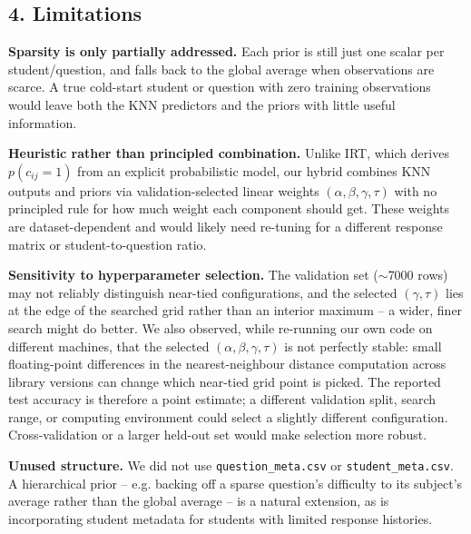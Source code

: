 \documentclass[11pt, letterpaper]{article}
\begin{document}
\subsection*{4. Limitations}

\textbf{Sparsity is only partially addressed.} Each prior is still just one scalar per student/question, and falls back to the global average when observations are scarce. A true cold-start student or question with zero training observations would leave both the KNN predictors and the priors with little useful information.

\textbf{Heuristic rather than principled combination.} Unlike IRT, which derives $p(c_{ij}=1)$ from an explicit probabilistic model, our hybrid combines KNN outputs and priors via validation-selected linear weights $(\alpha,\beta,\gamma,\tau)$ with no principled rule for how much weight each component should get. These weights are dataset-dependent and would likely need re-tuning for a different response matrix or student-to-question ratio.

\textbf{Sensitivity to hyperparameter selection.} The validation set ($\sim$7000 rows) may not reliably distinguish near-tied configurations, and the selected $(\gamma,\tau)$ lies at the edge of the searched grid rather than an interior maximum -- a wider, finer search might do better. We also observed, while re-running our own code on different machines, that the selected $(\alpha,\beta,\gamma,\tau)$ is not perfectly stable: small floating-point differences in the nearest-neighbour distance computation across library versions can change which near-tied grid point is picked. The reported test accuracy is therefore a point estimate; a different validation split, search range, or computing environment could select a slightly different configuration. Cross-validation or a larger held-out set would make selection more robust.

\textbf{Unused structure.} We did not use \texttt{question\_meta.csv} or \texttt{student\_meta.csv}. A hierarchical prior -- e.g. backing off a sparse question's difficulty to its subject's average rather than the global average -- is a natural extension, as is incorporating student metadata for students with limited response histories.
\end{document}

